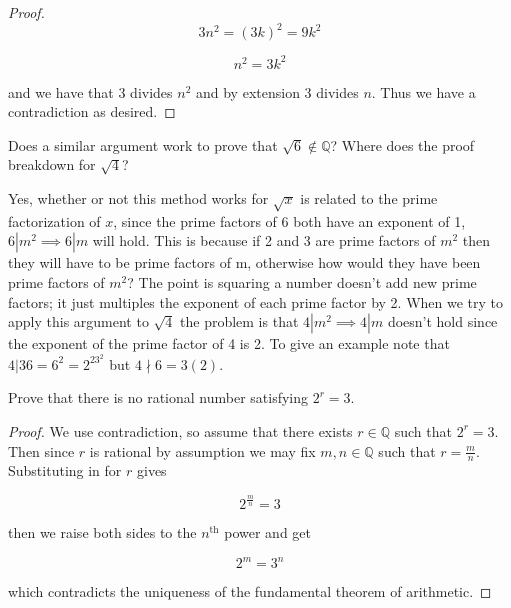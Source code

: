 \documentclass[11pt,largemargins]{homework}
\newcommand{\Q}{\mathbb{Q}}
\begin{document}
\begin{alphaparts}
\begin{proof}
                \begin{equation}
                     3n^2 = (3k)^2 = 9k^2
                \end{equation}
                
                \begin{equation}
                     n^2 = 3k^2 
                \end{equation}
                
                and we have that 3 divides $n^2$ and by extension 3 divides $n$. Thus we have a contradiction as desired.  
            \end{proof}
        \questionpart
            Does a similar argument work to prove that $\sqrt{6} \notin \Q$? Where does the proof breakdown for $\sqrt{4}$?
            
                Yes, whether or not this method works for $\sqrt{x}$ is related to the prime factorization of $x$, since the prime factors of 6 both have an exponent of 1, $6|m^2 \implies 6|m$ will hold. This is because if 2 and 3 are prime factors of $m^2$ then they will have to be prime factors of m, otherwise how would they have been prime factors of $m^2$? The point is squaring a number doesn't add new prime factors; it just multiples the exponent of each prime factor by 2. When we try to apply this argument to $\sqrt{4}$ the problem is that $4|m^2 \implies 4|m$ doesn't hold since the exponent of the prime factor of 4 is 2. To give an example note that $4|36 = 6^2 = 2^23^2$ but $4\nmid 6 = 3 (2) $. 
    \end{alphaparts}
    
    \question
    Prove that there is no rational number satisfying $2^r = 3$. 
    
    \begin{proof}
    We use contradiction, so assume that there exists $r \in \Q$ such that $2^r = 3$. Then since $r$ is rational by assumption we may fix $m, n \in \Q$ such that $r = \frac{m}{n}$. Substituting in for $r$ gives
    
    \[ 2^{\frac{m}{n}}  = 3\] 
    
    then we raise both sides to the $n^{\text{th}}$ power and get 
    
    \[ 2^m = 3^n \] 
    
    which contradicts the uniqueness of the fundamental theorem of arithmetic. 
    \end{proof}
\end{document}
